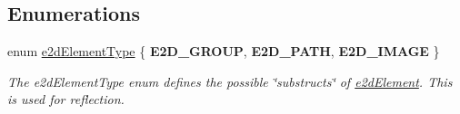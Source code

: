 \subsection*{Enumerations}
\begin{DoxyCompactItemize}
\item 
enum \hyperlink{group__e2dElement_ga9bc8cfdec08c7e9069fc707ee456fd38}{e2d\-Element\-Type} \{ {\bfseries E2\-D\-\_\-\-G\-R\-O\-U\-P}, 
{\bfseries E2\-D\-\_\-\-P\-A\-T\-H}, 
{\bfseries E2\-D\-\_\-\-I\-M\-A\-G\-E}
 \}
\begin{DoxyCompactList}\small\item\em The e2d\-Element\-Type enum defines the possible \char`\"{}substructs\char`\"{} of \hyperlink{structe2dElement}{e2d\-Element}. This is used for reflection. \end{DoxyCompactList}\end{DoxyCompactItemize}
